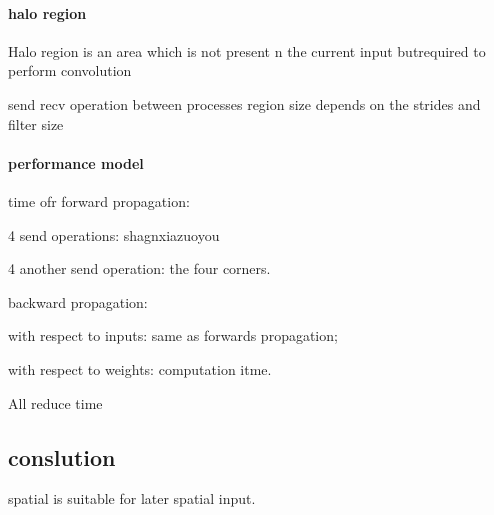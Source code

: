 \documentclass[12pt]{article}
\begin{document}
\paragraph{halo region}
Halo region is an area which is not present n the current input butrequired to perform convolution

send recv operation between processes
region size depends on the strides and filter size

\paragraph{performance model}
time ofr forward propagation:

4 send operations: shagnxiazuoyou

4 another send operation: the four corners.

backward propagation:

with respect to inputs: same as forwards propagation;

with respect to weights: computation itme.

All reduce time

\subsection{conslution}
spatial is suitable for later spatial input.
\end{document}
